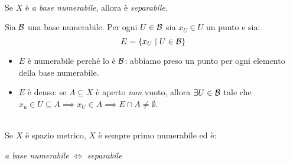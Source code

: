 \begin{lemming}~{}\label{basenumseparabile}\\
Se $X$ è \textit{a base numerabile}, allora è \textit{separabile}.
\end{lemming}
\begin{demonstration}
	Sia $\mathcal{B}$ una base numerabile. Per ogni $U\in\mathcal{B}$ sia $x_U\in U$ un punto e sia:
	\begin{equation*}
		E=\left\{x_U\mid U\in \mathcal{B}\right\}
	\end{equation*}
\begin{itemize}
	\item $E$ è numerabile perché lo è $\mathcal{B}$: abbiamo preso un punto per ogni elemento della base numerabile.
	\item $E$ è denso: se $A\subseteq X$ è aperto \textit{non} vuoto, allora $\exists U\in\mathcal{B}$ tale che $x_u\in U\subseteq A\implies x_U\in A\implies E\cap A\neq \emptyset$.
\end{itemize}
\vspace{-3mm}
\end{demonstration}
\begin{proposition}~{}\\
	Se $X$ è spazio metrico, $X$ è sempre primo numerabile ed è:
	\begin{center}
		\textit{a base numerabile} $\iff$ \textit{separabile}
	\end{center}
\vspace{-6mm}
\end{proposition}
